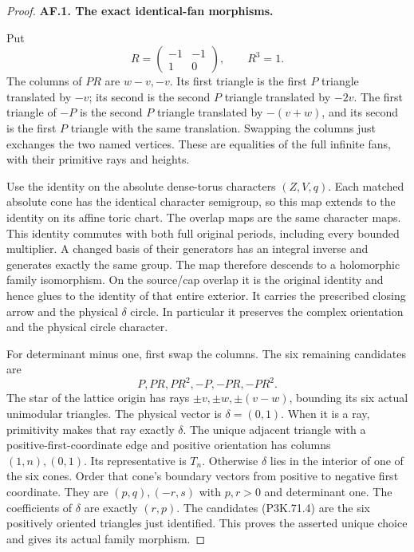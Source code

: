 \begin{proof}
\par\medskip\noindent\textbf{AF.1. The exact identical-fan morphisms.}\par\nopagebreak[4]

Put
\[
 R=\begin{pmatrix}-1&-1\\1&0\end{pmatrix},\qquad R^3=1.
\]
The columns of \(PR\) are \(w-v,-v\). Its first triangle is
the first \(P\) triangle translated by \(-v\); its second is
the second \(P\) triangle translated by \(-2v\). The first
triangle of \(-P\) is the second \(P\) triangle translated
by \(-(v+w)\), and its second is the first \(P\) triangle
with the same translation. Swapping the columns just exchanges
the two named vertices. These are equalities of the full
infinite fans, with their primitive rays and heights.

Use the identity on the absolute dense-torus characters
\((Z,V,q)\). Each matched absolute cone has the identical
character semigroup, so this map extends to the identity on
its affine toric chart. The overlap maps are the same character
maps. This identity commutes with both full original periods,
including every bounded multiplier. A changed basis of their
generators has an integral inverse and generates exactly the
same group. The map therefore descends to a holomorphic family
isomorphism. On the source/cap overlap it is the original
identity and hence glues to the identity of that entire exterior.
It carries the prescribed closing arrow and the physical
\(\delta\) circle. In particular it preserves the complex
orientation and the physical circle character.

For determinant minus one, first swap the columns. The six
remaining candidates are
\[
 P,PR,PR^2,-P,-PR,-PR^2.                              \tag{P3K.71.4}
\]
The star of the lattice origin has rays
\(\pm v,\pm w,\pm(v-w)\), bounding its six actual unimodular
triangles. The physical vector is \(\delta=(0,1)\). When it
is a ray, primitivity makes that ray exactly \(\delta\).
The unique adjacent triangle with a positive-first-coordinate
edge and positive orientation has columns \((1,n),(0,1)\).
Its representative is \(T_n\). Otherwise \(\delta\) lies
in the interior of one of the six cones. Order that cone's
boundary vectors from positive to negative first coordinate.
They are \((p,q),(-r,s)\) with \(p,r>0\) and determinant one.
The coefficients of \(\delta\) are exactly \((r,p)\).
The candidates (P3K.71.4) are the six positively oriented
triangles just identified. This proves the asserted unique
choice and gives its actual family morphism.


\end{proof}
